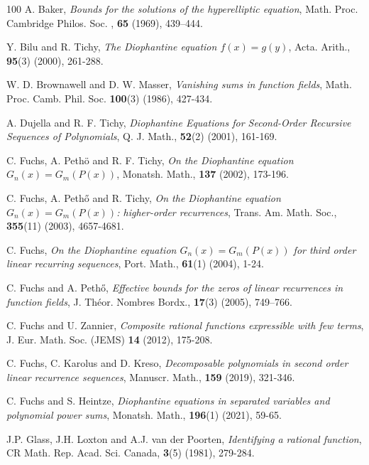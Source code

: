 \documentclass[12pt]{amsart}
\begin{document}
	
	\begin{thebibliography}{100}
	 A. Baker, \emph{Bounds for the solutions of the hyperelliptic equation},  Math. Proc. Cambridge Philos. Soc. , \textbf{65} (1969), 439–444.

	 Y. Bilu and R. Tichy, \emph{The Diophantine equation $f(x)=g(y)$}, Acta. Arith., \textbf{95}(3) (2000), 261-288.
	
	W. D. Brownawell and D. W. Masser, {\em Vanishing sums in function fields}, Math. Proc. Camb. Phil. Soc. {\bf 100}(3) (1986),  427-434.
	
	 A. Dujella and R. F. Tichy, \emph{Diophantine Equations for Second-Order Recursive Sequences of Polynomials}, Q. J. Math., \textbf{52}(2) (2001), 161-169.
		
	 C. Fuchs, A. Peth{\"o} and R. F. Tichy, \emph{On the Diophantine equation $G_n(x)= G_m(P(x))$}, Monatsh. Math., \textbf{137} (2002), 173-196.
	
	 C. Fuchs, A. Peth{\H{o}} and R. Tichy, \emph{On the Diophantine equation $G_n(x)=G_m(P(x))$: higher-order recurrences}, Trans. Am. Math. Soc., \textbf{355}(11) (2003), 4657-4681.
	
	 C. Fuchs, \emph{On the Diophantine equation $G_n(x)= G_m(P(x))$ for third order linear recurring sequences}, Port. Math., \textbf{61}(1) (2004), 1-24.

     C. Fuchs and A. Peth{\H{o}}, \emph{Effective bounds for the zeros of linear recurrences in function fields}, J. Th{\'e}or. Nombres Bordx., \textbf{17}(3) (2005), 749--766.

	 C. Fuchs and U. Zannier, {\em Composite rational functions expressible with few terms}, J. Eur. Math. Soc. (JEMS) {\bf 14} (2012), 175-208.
	
 C. Fuchs, C. Karolus and D. Kreso, \emph{Decomposable polynomials in second order linear recurrence sequences}, Manuscr. Math., \textbf{159} (2019), 321-346.
	
 C. Fuchs and S. Heintze, \emph{Diophantine equations in separated variables and polynomial power sums}, Monatsh. Math., \textbf{196}(1) (2021), 59-65.

 J.P. Glass, J.H. Loxton and A.J. van der Poorten, \emph{Identifying a rational function}, CR Math. Rep. Acad. Sci. Canada, \textbf{3}(5) (1981), 279-284.
	

\end{thebibliography}
\end{document}
